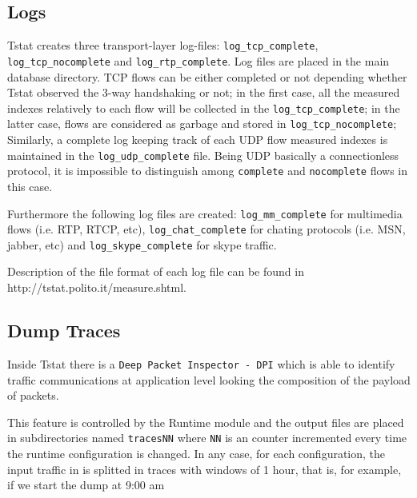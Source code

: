 \documentclass[11pt]{article}
\begin{document}
\subsection{Logs\label{Logs}}


Tstat creates three transport-layer log-files: \texttt{log\_tcp\_complete},
\texttt{log\_tcp\_nocomplete} and \texttt{log\_rtp\_complete}. 
Log files are placed in the main database directory.
TCP flows can be either completed or not depending whether Tstat observed the
3-way handshaking or not; in the first case, all the measured indexes relatively
to each flow will be collected in the \texttt{log\_tcp\_complete}; in the latter
case,  flows are considered as garbage and stored in \texttt{log\_tcp\_nocomplete};
Similarly, a complete log keeping track of each UDP flow measured indexes is
maintained in the \texttt{log\_udp\_complete} file. Being UDP basically a
connectionless protocol, it is impossible to distinguish among \texttt{complete} and
\texttt{nocomplete} flows in this case.



Furthermore the following log files are created: \texttt{log\_mm\_complete} for multimedia flows
(i.e. RTP, RTCP, etc), \texttt{log\_chat\_complete} for chating protocols (i.e. MSN, jabber, etc) and
\texttt{log\_skype\_complete} for skype traffic.



Description of the file format of each log file can be found in
\textsf{http://tstat.polito.it/measure.shtml}.

\subsection{Dump Traces\label{Dump_Traces}}


Inside Tstat there is a \texttt{Deep Packet Inspector - DPI} which is able to identify
traffic communications at application level looking the composition of the payload
of packets.



This feature is controlled by the \textsf{Runtime module} and the output
files are placed in subdirectories named \texttt{tracesNN} where \texttt{NN} is an counter
incremented every time the runtime configuration is changed.
In any case, for each configuration, the input traffic in 
is splitted in traces with windows of 1 hour, that is, for example,
if we start the dump at 9:00 am
\end{document}
